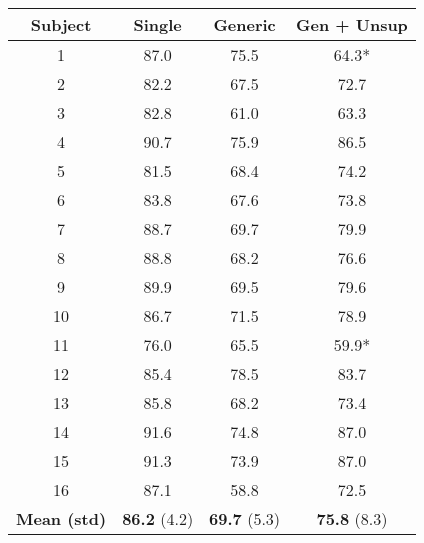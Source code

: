 \documentclass[11pt,a4paper]{article}
\begin{document}
\begin{table}[h]
\begin{center}
\begin{tabular}{|c|c||c|c|}
\hline
Subject & Single & Generic    & Gen + Unsup     \\
\hline
1       & 87.0     & 75.5     & 64.3*   \\
2       & 82.2     & 67.5     & 72.7    \\
3       & 82.8     & 61.0     & 63.3   \\
4       & 90.7     & 75.9     & 86.5   \\
5       & 81.5     & 68.4     & 74.2   \\
6       & 83.8     & 67.6     & 73.8   \\
7       & 88.7     & 69.7     & 79.9   \\
8       & 88.8     & 68.2     & 76.6   \\
9       & 89.9     & 69.5     & 79.6   \\
10      & 86.7     & 71.5     & 78.9   \\
11      & 76.0     & 65.5     & 59.9*   \\
12      & 85.4     & 78.5     & 83.7   \\
13      & 85.8     & 68.2     & 73.4   \\
14      & 91.6     & 74.8     & 87.0   \\
15      & 91.3     & 73.9     & 87.0   \\
16      & 87.1     & 58.8     & 72.5   \\
\hline
\hline
\textbf{Mean (std) }   & \textbf{86.2 } (4.2) & \textbf{69.7} (5.3)& \textbf{75.8} (8.3) \\
\hline
\hline
\end{tabular}
\end{center}
\end{table}
\end{document}

